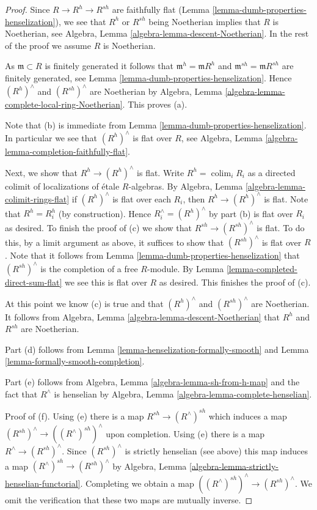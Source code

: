 \documentclass[10pt,a4paper]{amsart}
\theoremstyle{plain}
\theoremstyle{definition}
\theoremstyle{remark}
\numberwithin{equation}{subsection}
\def\colim{\mathop{\mathrm{colim}}\nolimits}
\begin{document}
\begin{proof}
Since $R \to R^h \to R^{sh}$ are faithfully flat
(Lemma \ref{lemma-dumb-properties-henselization}),
we see that $R^h$ or $R^{sh}$ being Noetherian implies that $R$
is Noetherian, see Algebra, Lemma \ref{algebra-lemma-descent-Noetherian}.
In the rest of the proof we assume $R$ is Noetherian.

\medskip\noindent
As $\mathfrak m \subset R$ is finitely generated it follows that
$\mathfrak m^h = \mathfrak m R^h$ and $\mathfrak m^{sh} = \mathfrak mR^{sh}$
are finitely generated, see Lemma \ref{lemma-dumb-properties-henselization}.
Hence $(R^h)^\wedge$ and $(R^{sh})^\wedge$ are Noetherian by
Algebra, Lemma \ref{algebra-lemma-complete-local-ring-Noetherian}.
This proves (a).

\medskip\noindent
Note that (b) is immediate from
Lemma \ref{lemma-dumb-properties-henselization}.
In particular we see that $(R^h)^\wedge$ is flat over $R$, see
Algebra, Lemma \ref{algebra-lemma-completion-faithfully-flat}.

\medskip\noindent
Next, we show that $R^h \to (R^h)^\wedge$ is flat.
Write $R^h = \colim_i R_i$ as a directed colimit of
localizations of \'etale $R$-algebras. By
Algebra, Lemma \ref{algebra-lemma-colimit-rings-flat}
if $(R^h)^\wedge$ is flat over each $R_i$, then $R^h \to (R^h)^\wedge$ is
flat. Note that $R^h = R_i^h$ (by construction).
Hence $R_i^\wedge = (R^h)^\wedge$
by part (b) is flat over $R_i$ as desired. To finish the proof of (c)
we show that $R^{sh} \to (R^{sh})^\wedge$ is flat. To do this, by a
limit argument as above, it suffices to show that $(R^{sh})^\wedge$
is flat over $R$. Note that it follows from
Lemma \ref{lemma-dumb-properties-henselization}
that $(R^{sh})^\wedge$ is the completion of a free $R$-module.
By Lemma \ref{lemma-completed-direct-sum-flat}
we see this is flat over $R$ as desired. This finishes the proof of (c).

\medskip\noindent
At this point we know (c) is true and that $(R^h)^\wedge$ and
$(R^{sh})^\wedge$ are Noetherian. It follows from
Algebra, Lemma \ref{algebra-lemma-descent-Noetherian}
that $R^h$ and $R^{sh}$ are Noetherian.

\medskip\noindent
Part (d) follows from Lemma \ref{lemma-henselization-formally-smooth}
and Lemma \ref{lemma-formally-smooth-completion}.

\medskip\noindent
Part (e) follows from Algebra, Lemma \ref{algebra-lemma-sh-from-h-map}
and the fact that $R^\wedge$ is henselian by
Algebra, Lemma \ref{algebra-lemma-complete-henselian}.

\medskip\noindent
Proof of (f). Using (e) there is a map $R^{sh} \to (R^\wedge)^{sh}$
which induces a map $(R^{sh})^\wedge \to ((R^\wedge)^{sh})^\wedge$
upon completion. Using (e) there is a map $R^\wedge \to (R^{sh})^\wedge$.
Since $(R^{sh})^\wedge$ is strictly henselian (see above) this map
induces a map $(R^\wedge)^{sh} \to (R^{sh})^\wedge$ by
Algebra, Lemma \ref{algebra-lemma-strictly-henselian-functorial}.
Completing we obtain a map $((R^\wedge)^{sh})^\wedge \to (R^{sh})^\wedge$.
We omit the verification that these two maps are mutually inverse.
\end{proof}
\end{document}
